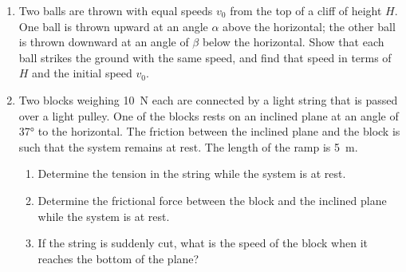 \documentclass{../../oss-apphys}
\begin{document}
\begin{enumerate}[leftmargin=15pt]

\item Two balls are thrown with equal speeds $v_0$ from the top of a cliff of
  height $H$. One ball is thrown upward at an angle $\alpha$ above the
  horizontal; the other ball is thrown downward at an angle of $\beta$ below
  the horizontal. Show that each ball strikes the ground with the same speed,
  and find that speed in terms of $H$ and the initial speed $v_0$.
  \vspace{2in}
  
  
\item Two blocks weighing \SI{10}{\newton} each are connected by a light string
  that is passed over a light pulley. One of the blocks rests on an inclined
  plane at an angle of \ang{37} to the horizontal. The friction between the
  inclined plane and the block is such that the system remains at rest. The
  length of the ramp is \SI{5}{\metre}.
  \begin{enumerate}[leftmargin=18pt,topsep=0pt,noitemsep]
  \item Determine the tension in the string while the system is at rest.
  \item Determine the frictional force between the block and the inclined plane
    while the system is at rest.
  \item If the string is suddenly cut, what is the speed of the block when it
    reaches the bottom of the plane?
  \end{enumerate}
  \newpage
  

\end{enumerate}
\end{document}
